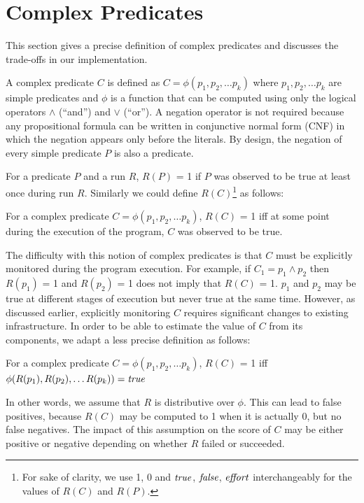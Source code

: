 
\section{Complex Predicates}
\label{sec-complex-preds}
This section gives a precise definition of complex predicates and discusses the trade-offs in our implementation.

A complex predicate $C$ is defined as $C = \phi(p_1, p_2, \ldots p_k)$ where $p_1, p_2, \ldots p_k$ are simple predicates and $\phi$ is a function that can be computed using only the logical operators $\wedge$ (``and'') and $\vee$ (``or'').  A negation operator is not required because any propositional formula can be written in conjunctive normal form (CNF) in which the negation appears only before the literals.  By design, the negation of every simple predicate $P$ is also a predicate.

For a predicate $P$ and a run $R$, $R(P)$ = 1 if $P$ was observed to be true at least once during run $R$.  Similarly we could define $R(C)${\footnote{For sake of clarity, we use 1, 0 and $\mathit{true}$, $\mathit{false}$, $\mathit{effort}$ interchangeably for the values of $R(C)$ and $R(P)$.}} as follows:
\begin{defn}
\label{dfn1}
For a complex predicate $C = \phi(p_1, p_2, \ldots p_k)$, $R(C)$ = 1 iff at some point during the execution of the program, $C$ was observed to be true.
\end{defn}

The difficulty with this notion of complex predicates is that $C$ must be explicitly monitored during the program execution.  For example, if $C_1 = p_1 \wedge p_2$ then $R(p_1)$ = 1 and $R(p_2)$ = 1 does not imply that $R(C)$ = 1.  $p_1$ and $p_2$ may be true at different stages of execution but never true at the same time.  However, as discussed earlier, explicitly monitoring $C$ requires significant changes to existing infrastructure.  In order to be able to estimate the value of $C$ from its components, we adapt a less precise definition as follows:
\begin{defn}
\label{dfn2}
For a complex predicate $C = \phi(p_1, p_2, \ldots p_k)$, $R(C)$ = 1 iff $\phi(R(p_1), R(p_2), \ldots R(p_k)) = \mathit{true}$
\end{defn}

In other words, we assume that $R$ is distributive over $\phi$.  This can lead to false positives, because $R(C)$ may be computed to 1 when it is actually 0, but no false negatives.  The impact of this assumption on the score of $C$ may be either positive or negative depending on whether $R$ failed or succeeded.


